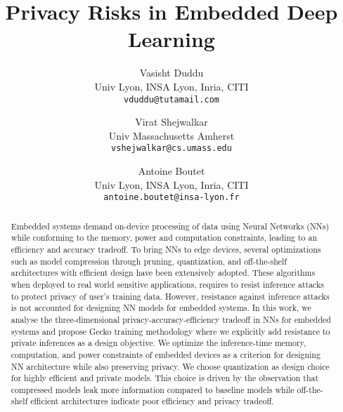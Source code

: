 \documentclass{article}
\begin{document}
\title{Privacy Risks in Embedded Deep Learning}


\author{
Vasisht Duddu \\
Univ Lyon, INSA Lyon, Inria, CITI\\
\texttt{vduddu@tutamail.com}\\
\and
Virat Shejwalkar\\
Univ Massachusetts Amherst\\
\texttt{vshejwalkar@cs.umass.edu}\\
\and
Antoine Boutet\\
Univ Lyon, INSA Lyon, Inria, CITI\\
\texttt{antoine.boutet@insa-lyon.fr}\\
}




\maketitle


\begin{abstract}
Embedded systems demand on-device processing of data using Neural Networks (NNs) while conforming to the memory, power and computation constraints, leading to an efficiency and accuracy tradeoff. To bring NNs to edge devices, several optimizations such as model compression through pruning, quantization, and off-the-shelf architectures with efficient design have been extensively adopted. These algorithms when deployed to real world sensitive applications, requires to resist inference attacks to protect privacy of user’s training data. However, resistance against inference attacks is not accounted for designing NN models for embedded systems. In this work, we analyse the three-dimensional privacy-accuracy-efficiency tradeoff in NNs for embedded systems and propose Gecko training methodology where we explicitly add resistance to private inferences as a design objective.
We optimize the inference-time memory, computation, and power constraints of embedded devices as a criterion for designing NN architecture while also preserving privacy.
We choose quantization as design choice for highly efficient and private models. This choice is driven by the observation that compressed models leak more information compared to baseline models while off-the-shelf efficient architectures indicate poor efficiency and privacy tradeoff.
\end{abstract}













\end{document}
